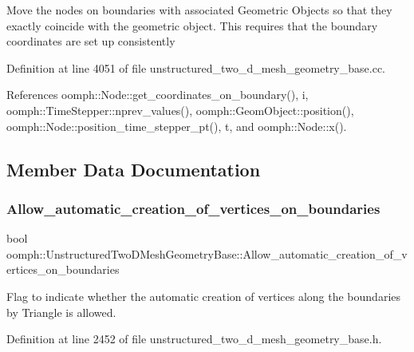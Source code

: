 Move the nodes on boundaries with associated Geometric Objects so that they exactly coincide with the geometric object. This requires that the boundary coordinates are set up consistently 

Definition at line 4051 of file unstructured\+\_\+two\+\_\+d\+\_\+mesh\+\_\+geometry\+\_\+base.\+cc.



References oomph\+::\+Node\+::get\+\_\+coordinates\+\_\+on\+\_\+boundary(), i, oomph\+::\+Time\+Stepper\+::nprev\+\_\+values(), oomph\+::\+Geom\+Object\+::position(), oomph\+::\+Node\+::position\+\_\+time\+\_\+stepper\+\_\+pt(), t, and oomph\+::\+Node\+::x().



\subsection{Member Data Documentation}
\mbox{\label{classoomph_1_1UnstructuredTwoDMeshGeometryBase_a76998de1646db8791b5c4935e9820577}} 
\subsubsection{\texorpdfstring{Allow\+\_\+automatic\+\_\+creation\+\_\+of\+\_\+vertices\+\_\+on\+\_\+boundaries}{Allow\_automatic\_creation\_of\_vertices\_on\_boundaries}}
{\footnotesize\ttfamily bool oomph\+::\+Unstructured\+Two\+D\+Mesh\+Geometry\+Base\+::\+Allow\+\_\+automatic\+\_\+creation\+\_\+of\+\_\+vertices\+\_\+on\+\_\+boundaries\hspace{0.3cm}{\ttfamily [protected]}}



Flag to indicate whether the automatic creation of vertices along the boundaries by Triangle is allowed. 



Definition at line 2452 of file unstructured\+\_\+two\+\_\+d\+\_\+mesh\+\_\+geometry\+\_\+base.\+h.

